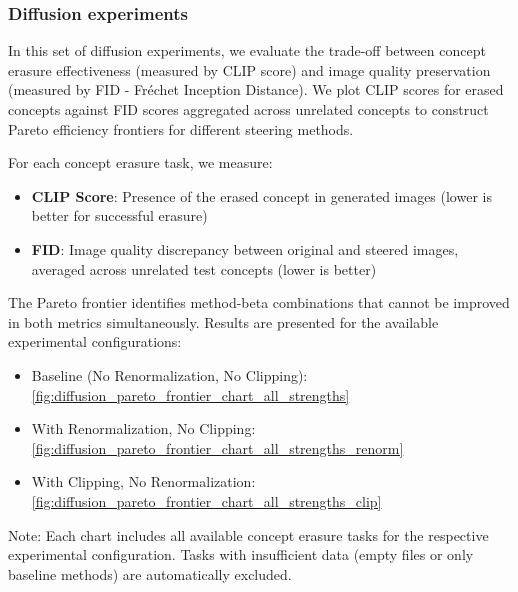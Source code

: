 \subsubsection{Diffusion experiments}

In this set of diffusion experiments, we evaluate the trade-off between concept erasure effectiveness (measured by CLIP score) and image quality preservation (measured by FID - Fréchet Inception Distance). We plot CLIP scores for erased concepts against FID scores aggregated across unrelated concepts to construct Pareto efficiency frontiers for different steering methods.

For each concept erasure task, we measure:
\begin{itemize}
    \item \textbf{CLIP Score}: Presence of the erased concept in generated images (lower is better for successful erasure)
    \item \textbf{FID}: Image quality discrepancy between original and steered images, averaged across unrelated test concepts (lower is better)
\end{itemize}

The Pareto frontier identifies method-beta combinations that cannot be improved in both metrics simultaneously. Results are presented for the available experimental configurations:

\begin{itemize}
    \item Baseline (No Renormalization, No Clipping): \ref{fig:diffusion_pareto_frontier_chart_all_strengths}
    \item With Renormalization, No Clipping: \ref{fig:diffusion_pareto_frontier_chart_all_strengths_renorm}
    \item With Clipping, No Renormalization: \ref{fig:diffusion_pareto_frontier_chart_all_strengths_clip}
\end{itemize}

Note: Each chart includes all available concept erasure tasks for the respective experimental configuration. Tasks with insufficient data (empty files or only baseline methods) are automatically excluded.

